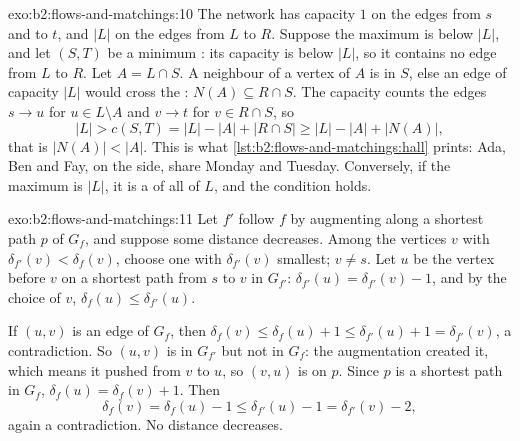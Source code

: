 \begin{solution}{exo:b2:flows-and-matchings:10}
The network has capacity $1$ on the edges from $s$ and to $t$, and $|L|$ on the edges from $L$ to $R$. Suppose the
maximum  is below $|L|$, and let $(S, T)$ be a minimum : its capacity is below $|L|$, so it contains no edge from
$L$ to $R$. Let $A = L \cap S$. A neighbour of a vertex of $A$ is in $S$, else an edge of capacity $|L|$ would cross the
: $N(A) \subseteq R \cap S$. The capacity counts the edges $s \to u$ for $u \in L \setminus A$ and $v \to t$ for $v \in
R \cap S$, so
\[
|L| > c(S, T) = |L| - |A| + |R \cap S| \geq |L| - |A| + |N(A)|,
\]
that is $|N(A)| < |A|$. This is what \cref{lst:b2:flows-and-matchings:hall} prints: Ada, Ben and Fay, on the  side,
share Monday and Tuesday. Conversely, if the maximum  is $|L|$, it is a  of all of $L$, and the condition
holds.
\end{solution}

\begin{solution}{exo:b2:flows-and-matchings:11}
Let $f'$ follow $f$ by augmenting along a shortest path $p$ of $G_f$, and suppose some distance decreases. Among the
vertices $v$ with $\delta_{f'}(v) < \delta_f(v)$, choose one with $\delta_{f'}(v)$ smallest; $v \neq s$. Let $u$ be the
vertex before $v$ on a shortest path from $s$ to $v$ in $G_{f'}$: $\delta_{f'}(u) = \delta_{f'}(v) - 1$, and by the
choice of $v$, $\delta_f(u) \leq \delta_{f'}(u)$.

If $(u, v)$ is an edge of $G_f$, then $\delta_f(v) \leq \delta_f(u) + 1 \leq \delta_{f'}(u) + 1 = \delta_{f'}(v)$, a
contradiction. So $(u, v)$ is in $G_{f'}$ but not in $G_f$: the augmentation created it, which means it pushed  from
$v$ to $u$, so $(v, u)$ is on $p$. Since $p$ is a shortest path in $G_f$, $\delta_f(u) = \delta_f(v) + 1$. Then
\[
\delta_f(v) = \delta_f(u) - 1 \leq \delta_{f'}(u) - 1 = \delta_{f'}(v) - 2,
\]
again a contradiction. No distance decreases.
\end{solution}

